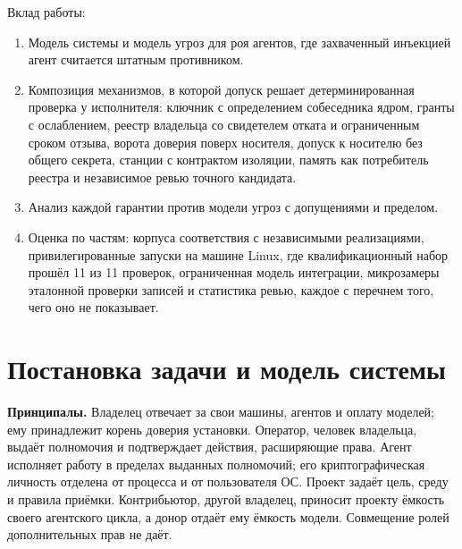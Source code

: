 \documentclass[10pt,a4paper]{article}
\begin{document}
Вклад работы:
\begin{enumerate}
\item Модель системы и модель угроз для роя агентов, где захваченный инъекцией агент считается штатным противником.
\item Композиция механизмов, в которой допуск решает детерминированная проверка у исполнителя: ключник с определением собеседника ядром, гранты с ослаблением, реестр владельца со свидетелем отката и ограниченным сроком отзыва, ворота доверия поверх носителя, допуск к носителю без общего секрета, станции с контрактом изоляции, память как потребитель реестра и независимое ревью точного кандидата.
\item Анализ каждой гарантии против модели угроз с допущениями и пределом.
\item Оценка по частям: корпуса соответствия с независимыми реализациями, привилегированные запуски на машине Linux, где квалификационный набор прошёл 11 из 11 проверок, ограниченная модель интеграции, микрозамеры эталонной проверки записей и статистика ревью, каждое с перечнем того, чего оно не показывает.
\end{enumerate}

\section{Постановка задачи и модель системы}
\label{sec:model}

\textbf{Принципалы.} Владелец отвечает за свои машины, агентов и оплату моделей; ему принадлежит корень доверия установки. Оператор, человек владельца, выдаёт полномочия и подтверждает действия, расширяющие права. Агент исполняет работу в пределах выданных полномочий; его криптографическая личность отделена от процесса и от пользователя ОС. Проект задаёт цель, среду и правила приёмки. Контрибьютор, другой владелец, приносит проекту ёмкость своего агентского цикла, а донор отдаёт ему ёмкость модели. Совмещение ролей дополнительных прав не даёт.
\end{document}
